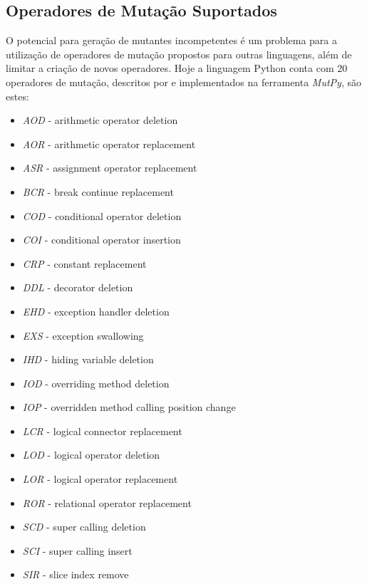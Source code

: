 \documentclass[12pt]{article}
\begin{document}
\subsection{Operadores de Mutação Suportados}

O potencial para geração de mutantes incompetentes é um problema para
a utilização de operadores de mutação propostos para outras linguagens,
além de limitar a criação de novos operadores. Hoje a linguagem Python conta com 20 operadores
de mutação, descritos por \cite{Derezinska:2014} e implementados na ferramenta
\textit{MutPy}\footnotemark, são estes:

\renewcommand{\labelitemi}{}
\begin{itemize}
    \item \textit{AOD} - arithmetic operator deletion
    \item \textit{AOR} - arithmetic operator replacement
    \item \textit{ASR} - assignment operator replacement
    \item \textit{BCR} - break continue replacement
    \item \textit{COD} - conditional operator deletion
    \item \textit{COI} - conditional operator insertion
    \item \textit{CRP} - constant replacement
    \item \textit{DDL} - decorator deletion
    \item \textit{EHD} - exception handler deletion
    \item \textit{EXS} - exception swallowing
    \item \textit{IHD} - hiding variable deletion
    \item \textit{IOD} - overriding method deletion
    \item \textit{IOP} - overridden method calling position change
    \item \textit{LCR} - logical connector replacement
    \item \textit{LOD} - logical operator deletion
    \item \textit{LOR} - logical operator replacement
    \item \textit{ROR} - relational operator replacement
    \item \textit{SCD} - super calling deletion
    \item \textit{SCI} - super calling insert
    \item \textit{SIR} - slice index remove
\end{itemize}
\end{document}
